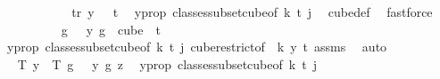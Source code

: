 \begin{isabellebody}
\isanewline
\ \ \ \ \ \ \ \ \isamarkupfalse%
\ \isamarkupfalse%
\ tr{\isacharcolon}{\kern0pt}\ {\isachardoublequoteopen}y\ {}\ {\isacharless}{\kern0pt}\ t{\isachardoublequoteclose}\ \isamarkupfalse%
\ y{\isacharunderscore}{\kern0pt}prop\ classes{\isacharunderscore}{\kern0pt}subset{\isacharunderscore}{\kern0pt}cube{\isacharbrackleft}{\kern0pt}of\ {\isachardoublequoteopen}k{\isacharplus}{\kern0pt}{}{\isachardoublequoteclose}\ t\ j{\isacharbrackright}{\kern0pt}\ \isamarkupfalse%
\ cube{\isacharunderscore}{\kern0pt}def\ \isamarkupfalse%
\ fastforce\isanewline
\isanewline
\ \ \ \ \ \ \ \ \isamarkupfalse%
\ {\isachardoublequoteopen}{\isacharparenleft}{\kern0pt}{\isasymlambda}g\ {\isasymin}\ {\isacharbraceleft}{\kern0pt}{\isachardot}{\kern0pt}{\isachardot}{\kern0pt}{\isacharless}{\kern0pt}{}{\isacharbraceright}{\kern0pt}{\isachardot}{\kern0pt}\ y\ g{\isacharparenright}{\kern0pt}\ {\isasymin}\ cube\ {}\ {\isacharparenleft}{\kern0pt}t{\isacharplus}{\kern0pt}{}{\isacharparenright}{\kern0pt}{\isachardoublequoteclose}\ \isanewline
\ \ \ \ \ \ \ \ \ \ \isamarkupfalse%
\ y{\isacharunderscore}{\kern0pt}prop\ classes{\isacharunderscore}{\kern0pt}subset{\isacharunderscore}{\kern0pt}cube{\isacharbrackleft}{\kern0pt}of\ {\isachardoublequoteopen}k{\isacharplus}{\kern0pt}{}{\isachardoublequoteclose}\ t\ j{\isacharbrackright}{\kern0pt}\ cube{\isacharunderscore}{\kern0pt}restrict{\isacharbrackleft}{\kern0pt}of\ {}\ {\isachardoublequoteopen}{\isacharparenleft}{\kern0pt}k{\isacharplus}{\kern0pt}{}{\isacharparenright}{\kern0pt}{\isachardoublequoteclose}\ y\ {\isachardoublequoteopen}t{\isacharplus}{\kern0pt}{}{\isachardoublequoteclose}{\isacharbrackright}{\kern0pt}\ assms{\isacharparenleft}{\kern0pt}{}{\isacharparenright}{\kern0pt}\ \isamarkupfalse%
\ auto\isanewline
\ \ \ \ \ \ \ \ \isamarkupfalse%
\ \isamarkupfalse%
\ {\isachardoublequoteopen}T\ y\ {\isacharequal}{\kern0pt}\ T{\isacharprime}{\kern0pt}\ {\isacharparenleft}{\kern0pt}{\isasymlambda}g\ {\isasymin}\ {\isacharbraceleft}{\kern0pt}{\isachardot}{\kern0pt}{\isachardot}{\kern0pt}{\isacharless}{\kern0pt}{}{\isacharbraceright}{\kern0pt}{\isachardot}{\kern0pt}\ y\ g{\isacharparenright}{\kern0pt}\ z{\isachardoublequoteclose}\ \isamarkupfalse%
\ y{\isacharunderscore}{\kern0pt}prop\ classes{\isacharunderscore}{\kern0pt}subset{\isacharunderscore}{\kern0pt}cube{\isacharbrackleft}{\kern0pt}of\ {\isachardoublequoteopen}k{\isacharplus}{\kern0pt}{}{\isachardoublequoteclose}\ t\ j{\isacharbrackright}{\kern0pt}\ \isanewline

\end{isabellebody}
